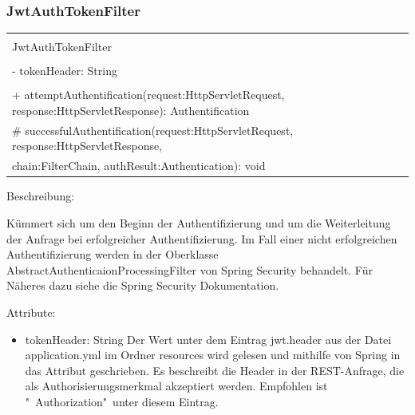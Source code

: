 \documentclass[a4paper,20pt,oneside]{book}
\begin{document}
	\subsubsection{JwtAuthTokenFilter}
\centering
	\begin{tabular}{|l|}
	\hline \\
	JwtAuthTokenFilter\\ \hline \\
	- tokenHeader: String\\
	 \hline \\
	+ attemptAuthentification(request:HttpServletRequest, response:HttpServletResponse): Authentification\\
	\# successfulAuthentification(request:HttpServletRequest, response:HttpServletResponse,\\ chain:FilterChain, authResult:Authentication): void\\

	 \hline
	\end{tabular}
		 
	\vspace{0.7cm}
	\raggedright
	Beschreibung:

	Kümmert sich um den Beginn der Authentifizierung und um die Weiterleitung der Anfrage bei erfolgreicher Authentifizierung. Im Fall einer nicht erfolgreichen Authentifizierung werden in der Oberklasse AbstractAuthenticaionProcessingFilter von Spring Security behandelt. Für Näheres dazu siehe die Spring Security Dokumentation.
	
	\vspace{0.5cm}
	Attribute:
	\begin{itemize}
	\item tokenHeader: String \linebreak
	Der Wert unter dem Eintrag jwt.header aus der Datei application.yml im Ordner resources wird gelesen und mithilfe von Spring in das Attribut geschrieben. Es beschreibt die Header in der REST-Anfrage, die als Authorisierungsmerkmal akzeptiert werden. Empfohlen ist "\ Authorization"\ unter diesem Eintrag.
	\end{itemize}
	
\end{document}
